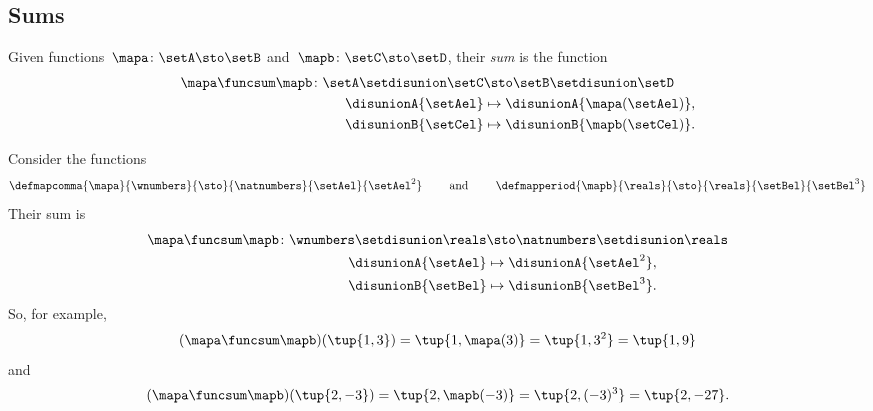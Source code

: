 \subsection{Sums}

\begin{ctdefinition}
    \label{def:sum-of-functions}
    Given functions~$\mapa\colon \setA \sto \setB$ and~$\mapb\colon \setC \sto \setD$, their \emph{sum} is the function
    \begin{equation}
        \begin{aligned}
            \mapa \funcsum \mapb \colon \setA \setdisunion \setC & \sto \setB\setdisunion \setD \\
            \disunionA{\setAel}                                  & \mapsto \disunionA{\mapa(\setAel)}, \\
            \disunionB{\setCel}                                  & \mapsto \disunionB{\mapb(\setCel)}.
            \\
        \end{aligned}
    \end{equation}
\end{ctdefinition}

\begin{example}
    Consider the functions
    \begin{equation}
        \defmapcomma{
            \mapa
        }{
            \wnumbers
        }{
            \sto
        }{
            \natnumbers
        }{
            \setAel
        }{
            \setAel^2
        }
\quad \quad  \text{ and } \quad \quad 
        \defmapperiod{
            \mapb
        }{
            \reals
        }{
            \sto
        }{
            \reals
        }{
            \setBel
        }{
            \setBel^3
        }
    \end{equation}
    Their sum is 
    \begin{equation}
        \begin{aligned}
            \mapa \funcsum \mapb \colon \wnumbers \setdisunion \reals & \sto \natnumbers \setdisunion \reals \\
            \disunionA{\setAel}                                       & \mapsto \disunionA{\setAel^2}, \\
            \disunionB{\setBel}                                       & \mapsto \disunionB{\setBel^3}.
            \\
        \end{aligned}
    \end{equation}
    So, for example,
    \begin{equation}
    (\mapa \funcsum \mapb)(\tup{1,3})=\tup{1,\mapa(3)}=\tup{1,3^2}=\tup{1,9}
    \end{equation}
    and
    \begin{equation}
        (\mapa \funcsum \mapb)(\tup{2,-3})=\tup{2,\mapb(-3)}=\tup{2,(-3)^3}=\tup{2,-27}.
    \end{equation}
\end{example}



